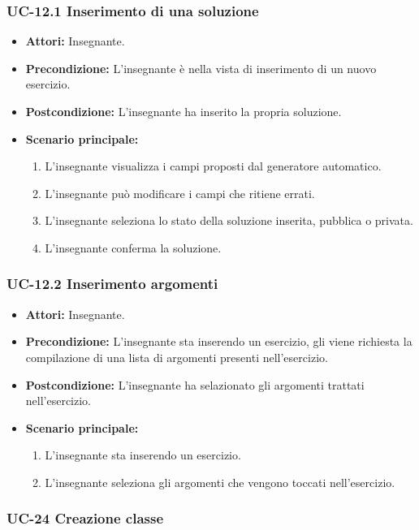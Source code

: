 \subsubsection{UC-12.1 Inserimento di una soluzione}
\begin{itemize}
\item \textbf{Attori: }Insegnante.
\item \textbf{Precondizione: }L'insegnante è nella vista di inserimento di un nuovo esercizio.
\item \textbf{Postcondizione: }L'insegnante ha inserito la propria soluzione.
\item \textbf{Scenario principale: }
		\begin{enumerate} 
		\item L'insegnante visualizza i campi proposti dal generatore automatico. 
		\item L'insegnante può modificare i campi che ritiene errati.
		\item L'insegnante seleziona lo stato della soluzione inserita, pubblica o privata.
		\item L'insegnante conferma la soluzione.
		\end{enumerate}	
\end{itemize}

\subsubsection{UC-12.2 Inserimento argomenti}
\begin{itemize}
\item \textbf{Attori: }Insegnante.

\item \textbf{Precondizione:} L'insegnante sta inserendo un esercizio, gli viene richiesta la compilazione di una lista di argomenti presenti nell'esercizio.
\item \textbf{Postcondizione:} L'insegnante ha selazionato gli argomenti trattati nell'esercizio.
\item \textbf{Scenario principale: }
		\begin{enumerate}
		\item L'insegnante sta inserendo un esercizio. 
		\item L'insegnante seleziona gli argomenti che vengono toccati nell'esercizio. 
		\end{enumerate}
\end{itemize}				

\subsubsection{UC-24 Creazione classe}

